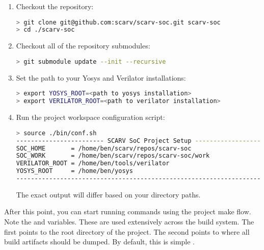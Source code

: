\begin{enumerate}

\item Checkout the repository:

\begin{lstlisting}[language=bash,style=block]
> git clone git@github.com:scarv/scarv-soc.git scarv-soc
> cd ./scarv-soc
\end{lstlisting}

\item Checkout all of the repository submodules:

\begin{lstlisting}[language=bash,style=block]
> git submodule update --init --recursive
\end{lstlisting}

\item Set the path to your Yosys and Verilator installations:

\begin{lstlisting}[language=bash,style=block]
> export YOSYS_ROOT=<path to yosys installation>
> export VERILATOR_ROOT=<path to verilator installation>
\end{lstlisting}

\item Run the project workspace configuration script:

\begin{lstlisting}[language=bash,style=block]
> source ./bin/conf.sh
------------------------ SCARV SoC Project Setup ----------------------
SOC_HOME       = /home/ben/scarv/repos/scarv-soc
SOC_WORK       = /home/ben/scarv/repos/scarv-soc/work
VERILATOR_ROOT = /home/ben/tools/verilator
YOSYS_ROOT     = /home/ben/yosys
-----------------------------------------------------------------------
\end{lstlisting}

The exact output will differ based on your directory paths.

\end{enumerate}

After this point, you can start running commands using the project
make flow.
Note the \SOCHOME and \SOCWORK variables.
These are used extensively across the build system.
The first points to the root directory of the project.
The second points to where all build artifacts should be dumped.
By default, this is simple .

